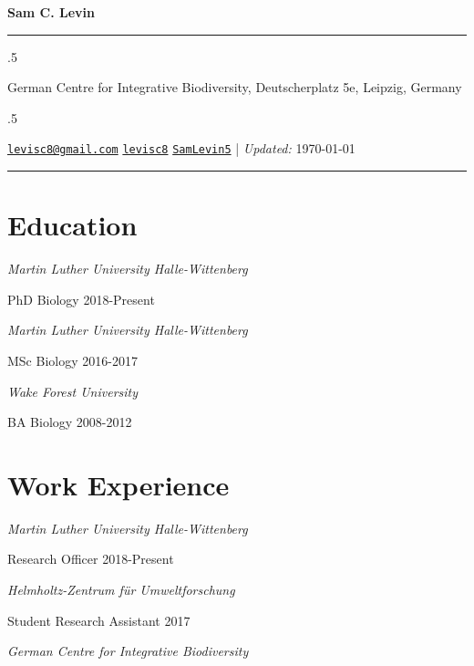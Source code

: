 \documentclass[11pt,]{article}
\begin{document}
\centerline{\huge \bf Sam C. Levin}

\vspace{2 mm}

\hrule

\vspace{2 mm}


\moveleft.5\hoffset\centerline{German Centre for Integrative Biodiversity, Deutscherplatz 5e, Leipzig,
Germany}
\moveleft.5\hoffset\centerline{ \faEnvelopeO \hspace{1 mm} \href{mailto:}{\tt \href{mailto:levisc8@gmail.com}{\nolinkurl{levisc8@gmail.com}}} \hspace{1 mm}  \faGithub \hspace{1 mm} \href{http://github.com/levisc8}{\tt levisc8} \hspace{1 mm}   \faTwitter \hspace{1 mm} \href{https:/twitter.com/SamLevin5}{\tt SamLevin5} \hspace{1 mm}    | \emph{Updated:} \today}

\vspace{2 mm}

\hrule


\hypertarget{education}{%
\section{Education}\label{education}}

\emph{Martin Luther University Halle-Wittenberg}

PhD Biology \hfill 2018-Present

\emph{Martin Luther University Halle-Wittenberg}

MSc Biology \hfill 2016-2017

\emph{Wake Forest University}

BA Biology \hfill 2008-2012

\hypertarget{work-experience}{%
\section{Work Experience}\label{work-experience}}

\emph{Martin Luther University Halle-Wittenberg}

Research Officer \hfill 2018-Present

\emph{Helmholtz-Zentrum für Umweltforschung }

Student Research Assistant \hfill 2017

\emph{German Centre for Integrative Biodiversity}
\end{document}
